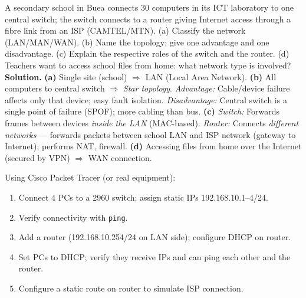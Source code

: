 \documentclass[11pt]{article}
\newcommand{\cle}[1]{{\popxbold\color{popdark}#1}}
\begin{document}
\begin{exoresolu}
A secondary school in Buea connects 30 computers in its ICT laboratory to one central switch; the switch connects to a router giving Internet access through a fibre link from an ISP (CAMTEL/MTN).
(a) Classify the network (LAN/MAN/WAN).
(b) Name the topology; give one advantage and one disadvantage.
(c) Explain the respective roles of the switch and the router.
(d) Teachers want to access school files from home: what network type is involved?
\tcblower
\textbf{Solution.}
\textbf{(a)} Single site (school) $\Rightarrow$ \cle{LAN} (Local Area Network).
\textbf{(b)} All computers to central switch $\Rightarrow$ \emph{Star topology}. \emph{Advantage:} Cable/device failure affects only that device; easy fault isolation. \emph{Disadvantage:} Central switch is a single point of failure (SPOF); more cabling than bus.
\textbf{(c)} \emph{Switch:} Forwards frames between devices \emph{inside the LAN} (MAC-based). \emph{Router:} Connects \emph{different networks} — forwards packets between school LAN and ISP network (gateway to Internet); performs NAT, firewall.
\textbf{(d)} Accessing files from home over the Internet (secured by VPN) $\Rightarrow$ \cle{WAN} connection.
\end{exoresolu}

\begin{experience}
Using Cisco Packet Tracer (or real equipment):
\begin{enumerate}
\item Connect 4 PCs to a 2960 switch; assign static IPs 192.168.10.1–4/24.
\item Verify connectivity with \texttt{ping}.
\item Add a router (192.168.10.254/24 on LAN side); configure DHCP on router.
\item Set PCs to DHCP; verify they receive IPs and can ping each other and the router.
\item Configure a static route on router to simulate ISP connection.
\end{enumerate}
\end{experience}
\end{document}
